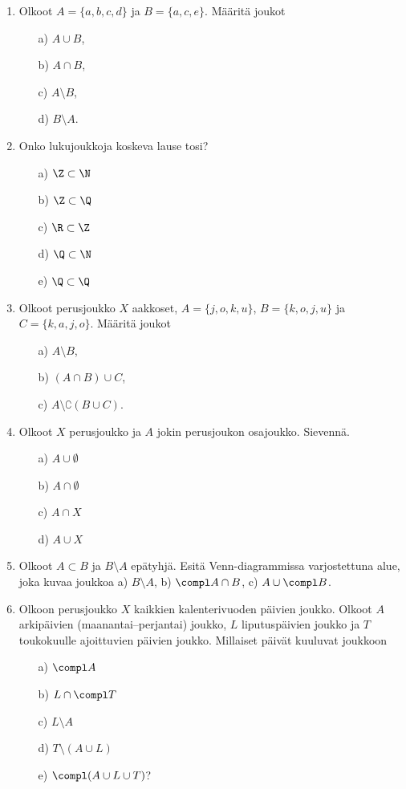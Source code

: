 \begin{enumerate}

\item Olkoot $A = \{a,b,c,d\}$ ja $B=\{a,c,e\}$. Määritä joukot
\begin{itemize}
\item[a)] $A \cup B$, 
\item[b)] $A \cap B$,
\item[c)] $A \setminus B$,
\item[d)] $B \setminus A$.
\end{itemize}

\item Onko lukujoukkoja koskeva lause tosi?
\begin{itemize}
\item[a)] $\Z \subset \N$
\item[b)] $\Z \subset \Q$
\item[c)] $\R \subset \Z$
\item[d)] $\Q \subset \N$
\item[e)] $\Q \subset \Q$
\end{itemize}

\item Olkoot perusjoukko $X$ aakkoset, $A=\{j,o,k,u\}$, $B=\{k,o,j,u\}$ ja $C=\{k,a,j,o\}$. Määritä joukot
\begin{itemize}
\item[a)] $A\setminus B$,
\item[b)] $(A\cap B)\cup C$,
\item[c)] $A\setminus \complement (B\cup C)$.
\end{itemize}

\item Olkoot $X$ perusjoukko ja $A$ jokin perusjoukon osajoukko. Sievennä.
\begin{itemize}
\item[a)] $A\cup \emptyset$
\item[b)] $A\cap \emptyset$
\item[c)] $A\cap X$
\item[d)] $A\cup X$
\end{itemize}

\item
Olkoot $A \subset B$ ja $B \setminus A$ epätyhjä. Esitä Venn-diagrammissa varjostettuna alue, joka kuvaa joukkoa a) $B \setminus A$, b) $\compl A \cap B$, c) $A \cup \compl B$.

\item
Olkoon perusjoukko $X$ kaikkien kalenterivuoden päivien joukko. Olkoot $A$ arkipäivien (maanantai--perjantai) joukko, $L$ liputuspäivien joukko ja $T$ toukokuulle ajoittuvien päivien joukko. Millaiset päivät kuuluvat joukkoon
\begin{itemize}
\item[a)] $\compl A$
\item[b)] $L \cap \compl T$
\item[c)] $L \setminus A$
\item[d)] $T \setminus (A \cup L)$
\item[e)] $\compl (A \cup L \cup T)$?
\end{itemize}


\end{enumerate}
